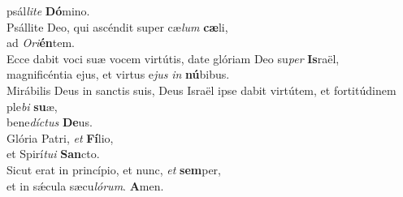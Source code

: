 \oddverse psál\textit{li}\textit{te} \textbf{Dó}mino.\\
\evenverse Psállite Deo, qui ascéndit super cæ\textit{lum} \textbf{cæ}li,~\*\\
\evenverse ad \textit{O}\textit{ri}\textbf{én}tem.\\
\oddverse Ecce dabit voci suæ vocem virtútis, date glóriam Deo su\textit{per} \textbf{Is}raël,~\*\\
\oddverse magnificéntia ejus, et virtus e\textit{jus} \textit{in} \textbf{nú}bibus.\\
\evenverse Mirábilis Deus in sanctis suis, Deus Israël ipse dabit virtútem, et fortitúdinem ple\textit{bi} \textbf{su}æ,~\*\\
\evenverse bene\textit{dí}\textit{ctus} \textbf{De}us.\\
\oddverse Glória Patri, \textit{et} \textbf{Fí}lio,~\*\\
\oddverse et Spirí\textit{tu}\textit{i} \textbf{San}cto.\\
\evenverse Sicut erat in princípio, et nunc, \textit{et} \textbf{sem}per,~\*\\
\evenverse et in sǽcula sæcu\textit{ló}\textit{rum}. \textbf{A}men.\\

